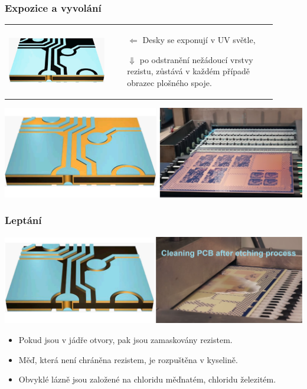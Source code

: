 \documentclass{beamer}
\begin{document}
\begin{frame}
	\frametitle{Expozice a vyvolání}

	\begin{center}
		\begin{tabular}{m{0.35\linewidth} m{0.55\linewidth}}
		 \includegraphics[scale=0.12]{jadroOsvit.png} &
			
			\begin{itemize}
				\item[$\Leftarrow$] Desky se exponují v UV světle,
				\item[$\Downarrow$] po odstranění nežádoucí vrstvy rezistu, zůstává v každém případě obrazec plošného spoje.
			\end{itemize}
		\end{tabular}
		\includegraphics[scale=0.15]{jadroVyvolani.png}
	\end{center}
	
\end{frame}
\begin{frame}
	\frametitle{Leptání}

	\begin{center}
		\includegraphics[scale=0.15]{jadroLeptani.png}
	\end{center}
	
	\begin{itemize}
		\item Pokud jsou v jádře otvory, pak jsou zamaskovány rezistem.
		\item Měď, která není chráněna rezistem, je rozpuštěna v kyselině.
		\item Obvyklé lázně jsou založené na chloridu měďnatém, chloridu železitém.
	\end{itemize}
\end{frame}
\end{document}
